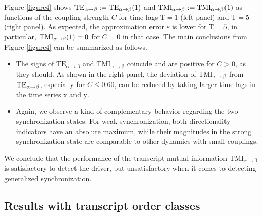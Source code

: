 \documentclass[%
 aip,
 amsmath,amssymb,
 reprint,%
]{revtex4-1}
\begin{document}
Figure \ref{figure4} shows $\mathrm{TE}_{\mathrm{\alpha }\rightarrow \mathrm{%
\beta }}:=\mathrm{TE}_{\mathrm{\alpha }\rightarrow \mathrm{\beta }}(1)$ and $%
\mathrm{TMI}_{\mathrm{\alpha }\rightarrow \mathrm{\beta }}:=\mathrm{TMI}_{%
\mathrm{\alpha }\rightarrow \mathrm{\beta }}(1)$ as functions of the
coupling strength $C$ for time lags $\textrm{T}=1$ (left panel) and $\textrm{T}=5$ (right panel). As expected, the approximation error $\varepsilon$ is lower for $\textrm{T}=5$, in particular, $\mathrm{TMI}_{\mathrm{%
\alpha }\rightarrow \mathrm{\beta }}(1)=0$ for $C=0$ in that case. The main conclusions from Figure \ref{figure4} can be summarized as follows.

\begin{itemize}
\item The signs of $\mathrm{TE}_{\mathrm{\alpha }\rightarrow \mathrm{\beta }%
} $ and $\mathrm{TMI}_{\mathrm{\alpha }\rightarrow \mathrm{\beta }}$
coincide and are positive for $C>0$, as they should. As shown in the right panel, the deviation of $\mathrm{TMI}_{\mathrm{\alpha }\rightarrow 
\mathrm{\beta }}$ from $\mathrm{TE}_{\mathrm{\alpha }\rightarrow \mathrm{%
\beta }}$, especially for $C\leq 0.60$, can be reduced by taking larger time
lags in the time series $\mathrm{x}$ and $\mathrm{y}$.

\item Again, we observe a kind of complementary behavior regarding the two
synchronization states. For weak synchronization, both directionality
indicators have an absolute maximum, while their magnitudes in the strong
synchronization state are comparable to other dynamics with small couplings.
\end{itemize}

We conclude that the performance of the transcript mutual information $%
\mathrm{TMI}_{\mathrm{\alpha }\rightarrow \mathrm{\beta }}$ is satisfactory
to detect the driver, but unsatisfactory when it comes to detecting
generalized synchronization.


\subsection{Results with transcript order classes}
\label{sec72}
\end{document}
